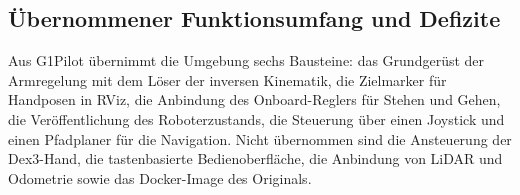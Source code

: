 \subsection{Übernommener Funktionsumfang und Defizite}
\label{sec:defizite}
Aus G1Pilot übernimmt die Umgebung sechs Bausteine: das Grundgerüst der Armregelung mit dem Löser der inversen Kinematik, die Zielmarker für Handposen in RViz, die Anbindung des Onboard-Reglers für Stehen und Gehen, die Veröffentlichung des Roboterzustands, die Steuerung über einen Joystick und einen Pfadplaner für die Navigation.
Nicht übernommen sind die Ansteuerung der Dex3-Hand, die tastenbasierte Bedienoberfläche, die Anbindung von LiDAR und Odometrie sowie das Docker-Image des Originals.


